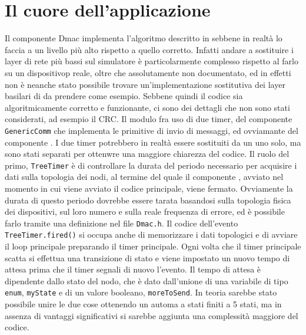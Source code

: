 \documentclass[twoside,11pt,a4paper,italian,openany]{book}
\begin{document}
\section{Il cuore dell'applicazione}
Il componente Dmac implementa l'algoritmo descritto in \cite{DMAC} sebbene in realtà lo faccia 
a un livello più alto rispetto a quello corretto. Infatti andare a sostituire i layer di rete 
più bassi sul simulatore è particolarmente complesso rispetto al farlo su un dispositivop reale, 
oltre che assolutamente non documentato, ed in effetti non è neanche stato possibile trovare 
un'implementazione sostitutiva dei layer basilari di \tos da prendere come esempio. 
Sebbene quindi il codice sia algoritmicamente corretto e funzionante,
ci sono dei dettagli che non sono stati considerati, ad esempio il CRC. 
Il modulo fra uso di due timer, del componente \texttt{GenericComm}  che implementa le 
primitive di invio di messaggi, ed ovviamante del componente \tree. 
I due timer potrebbero in realtà essere sostituiti da un uno solo, ma sono stati separati 
per ottenwre una maggiore chiarezza del codice.
Il ruolo del primo, \texttt{TreeTimer} è di controllare la durata del periodo necessario per
acquisire i dati sulla topologia dei nodi, al termine del quale il componente \tree, avviato 
nel momento in cui viene avviato il codice principale, viene fermato.
Ovviamente la durata di questo periodo dovrebbe essere tarata basandosi sulla topologia fisica 
dei dispositivi, sul loro numero e sulla reale frequenza di errore, ed è possibile farlo 
tramite una definizione nel file \texttt{Dmac.h}.
Il codice dell'evento \texttt{TreeTimer.fired()} si occupa anche di memorizzare i dati topologici
e di avviare il loop principale preparando il timer principale. 
Ogni volta che il timer principale scatta si effettua una transizione di stato e viene 
impostato un nuovo tempo di attesa prima che il timer segnali di nuovo l'evento. 
Il tempo di attesa è dipendente dallo stato del nodo, che è dato dall'unione di una variabile 
di tipo \texttt{enum}, \texttt{myState} e di un valore booleano, \texttt{moreToSend}. 
In teoria sarebbe stato possibile unire le due cose ottenendo un automa a stati finiti a 
5 stati, ma in assenza di vantaggi significativi si sarebbe aggiunta una complessità maggiore 
del codice. 
\end{document}

